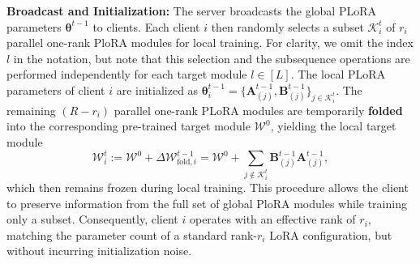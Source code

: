 \documentclass{article} %
\begin{document}



\textbf{Broadcast and Initialization:} The server broadcasts the global PLoRA parameters $\boldsymbol{\theta}^{t-1}$ to clients. 
Each client $i$ then randomly selects a subset $\mathcal{K}_i^{t}$ of $r_i$ parallel one-rank PloRA modules for local training. For clarity, we omit the index $l$ in the notation, but note that this selection and the subsequence operations are performed independently for each target module $l \in [L]$. The local PLoRA parameters of client $i$ are initialized as $\boldsymbol{\theta}_i^{t-1} = \{\mathbf{A}_{(j)}^{t-1}, \mathbf{B}_{(j)}^{t-1} \}_{j\in \mathcal{K}_i^{t}}$. 
The remaining $(R-r_i)$ parallel one-rank PLoRA modules are temporarily \textbf{folded} into the corresponding pre-trained target module $\boldsymbol{\mathcal{W}}^0$, {yielding the local target module }
\[
\boldsymbol{\mathcal{W}}_i^{t} := \boldsymbol{\mathcal{W}}^0 + \Delta\boldsymbol{\mathcal{W}}_{\text{fold},i}^{t-1} = \boldsymbol{\mathcal{W}}^0 + \sum_{j\notin \mathcal{K}_i^{t}} \mathbf{B}_{(j)}^{t-1}\mathbf{A}_{(j)}^{t-1},
\]
which then remains frozen during local training. 
% 
% 
This procedure allows the client to preserve information from the full set of global PloRA modules while training only a subset. Consequently, client $i$ operates with an effective rank of $r_i$, matching the parameter count of a standard rank-$r_i$ LoRA configuration, but without incurring initialization noise. 
\end{document}
